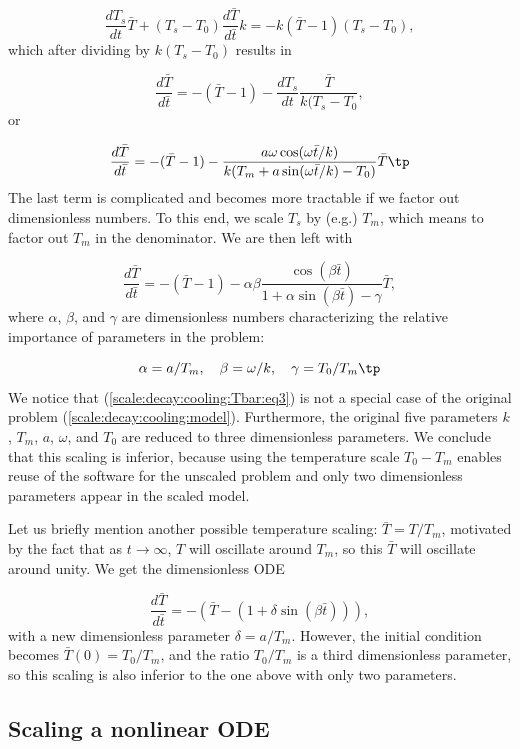\documentclass[graybox,envcountchap,sectrefs,final]{svmonodo}
\begin{document}
\[
\frac{dT_s}{dt}\bar T +
(T_s-T_0)\frac{d\bar T}{d\bar t}k
= -k(\bar T - 1)(T_s - T_0),
\]
which after dividing by $k(T_s-T_0)$ results in

\[
\frac{d\bar T}{d\bar t} = -(\bar T - 1) -
\frac{dT_s}{dt}\frac{\bar T}{k(T_s-T_0},
\]
or

\[
\frac{d\bar T}{d\bar t} = -(\bar T - 1) -
\frac{a\omega\cos(\omega \bar t/k)}{k(T_m + a\sin(\omega \bar t/k) -T_0)}\bar T
\tp
\]
The last term is complicated and becomes more tractable if we factor
out dimensionless numbers. To this end, we scale $T_s$ by (e.g.) $T_m$,
which means to factor out $T_m$ in the denominator. We are then
left with

\begin{equation}
\frac{d\bar T}{d\bar t} = -(\bar T - 1) -
\alpha\beta \frac{\cos(\beta \bar t)}{1 + \alpha\sin(\beta\bar t) - \gamma}
\bar T,
\label{scale:decay:cooling:Tbar:eq3}
\end{equation}
where $\alpha$, $\beta$, and $\gamma$ are dimensionless numbers
characterizing the relative importance of parameters in the problem:

\begin{equation}
\alpha=a/T_m,\quad \beta = \omega/k,\quad \gamma = T_0/T_m
\tp
\end{equation}
We notice that (\ref{scale:decay:cooling:Tbar:eq3})
is not a special case of the original problem
(\ref{scale:decay:cooling:model}). Furthermore, the original five
parameters $k$, $T_m$, $a$, $\omega$, and
$T_0$ are reduced to three dimensionless parameters.
We conclude that this scaling is inferior, because
using the temperature scale $T_0-T_m$ enables reuse of the software
for the unscaled problem and only two dimensionless parameters appear
in the scaled model.

Let us briefly mention another possible temperature scaling:
$\bar T = T/T_m$, motivated by the fact that as $t\rightarrow\infty$,
$T$ will oscillate around $T_m$, so this $\bar T$ will oscillate around
unity. We get the dimensionless ODE

\[ \frac{d\bar T}{d\bar t} = -(\bar T - (1 + \delta\sin(\beta\bar t))),\]
with a new dimensionless parameter $\delta = a/T_m$. However, the initial
condition becomes $\bar T(0)=T_0/T_m$, and the ratio $T_0/T_m$ is
a third dimensionless parameter, so this scaling is also inferior to the
one above with only two parameters.

\subsection{Scaling a nonlinear ODE}
\label{sec:scale:decay:nonlinear}
\end{document}
